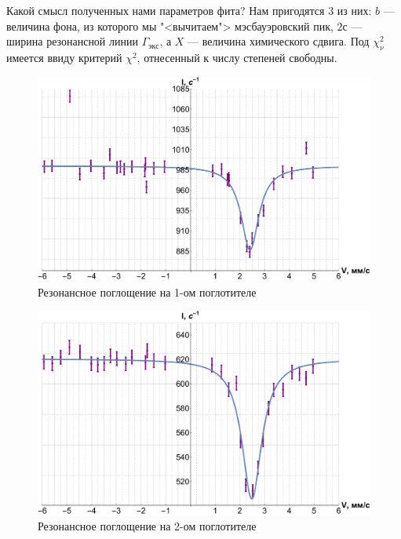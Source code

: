 \documentclass[12pt]{kiarticle} %
\begin{document}
 	Какой смысл полученных нами параметров фита? Нам пригодятся 3 из них: $ b $ --- величина фона, из которого мы "<вычитаем"> мэсбауэровский пик, $ 2с $ --- ширина резонансной линии $ \Gamma_{экс} $, а $ X $ --- величина химического сдвига. Под $ \chi_\nu^2 $ имеется ввиду критерий $ \chi^2 $, отнесенный к числу степеней свободны.
 
 	\begin{figure}[h]
 		\label{graf_1}
 		\includegraphics[scale=0.47]{gr1.pdf}
 		\caption{Резонансное поглощение на 1-ом поглотителе}
 	\end{figure}
 
 	\begin{figure}[h]
 		\label{graf_2}
 		\includegraphics[scale=0.47]{gr2.pdf}
 		\caption{Резонансное поглощение на 2-ом поглотителе}
 	\end{figure}
 
\end{document}
